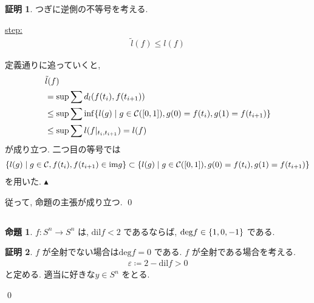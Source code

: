 \documentclass[platex, driver=dvipdfm, ja = standard, 10pt, fleqn, label-section=none]{bxjsarticle}
\theoremstyle{definition}
\newtheorem{prop}[dfn]{命題}
\newtheorem*{pf*}{証明}
\newcommand{\veps}{\varepsilon}
\newcommand{\cbra}[1]{\mleft\{#1\mright\}}
\newcommand{\dil}{\textrm{dil}}
\renewcommand{\;}{\, ; \,}
\newenvironment{claim}[1]{\par\noindent\underline{step:}\space#1}{}
\newenvironment{claimproof}[1]{\par\noindent{($\because$)}\space#1}{\hfill $\blacktriangle $}
\begin{document}
\begin{pf*}
つぎに逆側の不等号を考える.
\begin{claim}
\begin{align*} \tilde l (f) \leq l (f)  \end{align*}
\end{claim}
\begin{claimproof}
定義通りに追っていくと, 
\begin{align*}
&\tilde l (f) \\
&=  \sup \sum d_l (f(t_i), f(t_{i+1} ))   \\
&\leq \sup \sum \inf \cbra{l (g) \mid g \in \mathcal C([0,1]), g(0) = f(t_{i}), g(1) = f(t_{i+1})} \\
&\leq \sup \sum l(f |_{t_i, t_{i+1}}) = l(f) \end{align*}
が成り立つ. 二つ目の等号では
\begin{align*} \cbra{l (g) \mid g \in \mathcal C, f(t_{i}), f(t_{i+1}) \in \textrm{im} g }  \subset \cbra{l (g) \mid g \in \mathcal C([0,1]), g(0) = f(t_{i}), g(1) = f(t_{i+1})}   \end{align*}
を用いた. 
\end{claimproof}

従って, 命題の主張が成り立つ. 
\qed
\end{pf*}


\subsection{}


\begin{prop}
$f: S^n \rightarrow S^n$ は, $\dil f < 2$ であるならば, $\textrm{deg} f \in \cbra{1, 0, -1}$ である.
\end{prop}
\begin{pf*}
$f$ が全射でない場合は$\textrm{deg} f = 0$ である. $f$ が全射である場合を考える. 
\begin{align*} \veps \coloneqq  2 - \dil f > 0 \end{align*}
と定める. 適当に好きな$y \in S^n$ をとる. 



\qed
\end{pf*}
\end{document}

